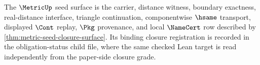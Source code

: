 The $\MetricUp$ seed surface is the carrier, distance witness, boundary exactness, real-distance interface, triangle continuation, componentwise $\hsame$ transport, displayed $\Cont$ replay, $\Pkg$ provenance, and local $\NameCert$ row described by \autoref{thm:metric-seed-closure-surface}. Its binding closure registration is recorded in the obligation-status child file, where the same checked Lean target is read independently from the paper-side closure grade.
